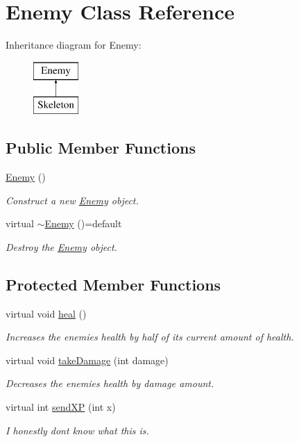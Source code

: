 \hypertarget{classEnemy}{}\section{Enemy Class Reference}
\label{classEnemy}
Inheritance diagram for Enemy\+:\begin{figure}[H]
\begin{center}
\leavevmode
\includegraphics[height=2.000000cm]{classEnemy}
\end{center}
\end{figure}
\subsection*{Public Member Functions}
\begin{DoxyCompactItemize}
\item 
\mbox{\hyperlink{classEnemy_a94f30d348b6d2840fd71675472ba38dd}{Enemy}} ()
\begin{DoxyCompactList}\small\item\em Construct a new \mbox{\hyperlink{classEnemy}{Enemy}} object. \end{DoxyCompactList}\item 
virtual \mbox{\hyperlink{classEnemy_aafb628c66008e33afdd750e2f492bd98}{$\sim$\+Enemy}} ()=default
\begin{DoxyCompactList}\small\item\em Destroy the \mbox{\hyperlink{classEnemy}{Enemy}} object. \end{DoxyCompactList}\end{DoxyCompactItemize}
\subsection*{Protected Member Functions}
\begin{DoxyCompactItemize}
\item 
virtual void \mbox{\hyperlink{classEnemy_a5f7ddbe448758f4a8eef7d846903ce99}{heal}} ()
\begin{DoxyCompactList}\small\item\em Increases the enemies health by half of it\textquotesingle{}s current amount of health. \end{DoxyCompactList}\item 
virtual void \mbox{\hyperlink{classEnemy_ae01c62a474fbcd547000ff1068976d49}{take\+Damage}} (int damage)
\begin{DoxyCompactList}\small\item\em Decreases the enemies health by damage amount. \end{DoxyCompactList}\item 
virtual int \mbox{\hyperlink{classEnemy_a755e7d44eb291517f28e9cad2c6c7111}{send\+XP}} (int x)
\begin{DoxyCompactList}\small\item\em I honestly don\textquotesingle{}t know what this is. \end{DoxyCompactList}\end{DoxyCompactItemize}
